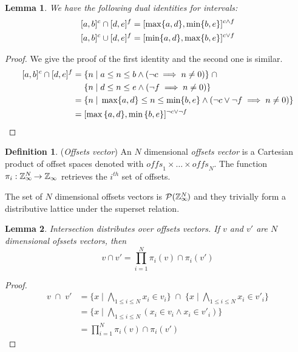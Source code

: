 \documentclass[acmlarge,review]{acmart}
\theoremstyle{definition}
\newtheorem{defn}{Definition}
\theoremstyle{plain}
\newtheorem{lem}{Lemma}
\theoremstyle{remark}
\begin{document}
\begin{lem}{}\label{lem:zinf-identities}
  We have the following dual identities for \zinf{} intervals:
%
  \begin{align*}
    \textnormal{$\lbrack a,b\rbrack^{c}$} \cap \textnormal{$\lbrack d,e\rbrack^{f}$} & =
      \textnormal{$\lbrack\max \{a,d\},\min \{b,e\}\rbrack^{c \wedge f}$} \\
    \textnormal{$\lbrack a,b\rbrack^{c}$} \cup \textnormal{$\lbrack d,e\rbrack^{f}$} & =
      \textnormal{$\lbrack\min \{a,d\},\max \{b,e\}\rbrack^{c \vee f}$}
  \end{align*}
\end{lem}
%
\begin{proof}
  We give the proof of the first identity and the second one is similar.
  \begin{align*}
    \textnormal{$\lbrack a,b\rbrack^{c}$} \cap \textnormal{$\lbrack d,e\rbrack^{f}$} = &
      \; \{ n \;|\; a \leq n \leq b \wedge (\neg c \implies n \neq 0) \}
      \;\cap \\
      & \; \{ n \;|\; d \leq n \leq e \wedge (\neg f \implies n \neq 0) \}
      \\
    = & \; \{ n \;|\; \max \{a,d\} \leq n \leq \min \{b,e\} \wedge (\neg c
      \vee \neg f \implies n \neq 0) \} \\
    = & \; \textnormal{$\lbrack\max{\{a,d\}},\min{\{b,e\}}\rbrack^{\neg c \vee \neg f}$}
  \end{align*}
\end{proof}

\begin{defn}{(\emph{Offsets vector})}
  An $N$ dimensional \emph{offsets vector} is a Cartesian product of offset
  spaces denoted with $\textit{offs}_1 \times \dots \times \textit{offs}_N$.
  The function $\pi_i : \textnormal{$\mathbb{Z}_\infty$}{}^{\mkern-19mu{N}} \to \textnormal{$\mathbb{Z}_\infty$}{}$ retrieves the
  $i^{th}$ set of offsets.

  The set of $N$ dimensional offsets vectors is
  $\mathcal{P}{(\textnormal{$\mathbb{Z}_\infty$}{}^{\mkern-19mu{N}})}$ and they trivially form a
  distributive lattice under the superset relation.
\end{defn}

\begin{lem}{}\label{lem:vector-intersect}
  Intersection distributes over offsets vectors. If $v$ and $v'$ are $N$
  dimensional ofssets vectors, then
%
  \begin{equation*}
    v \cap v' = \prod_{i = 1}^{N} \pi_i(v) \cap \pi_i(v')
  \end{equation*}
\end{lem}
%
\begin{proof}
  \begin{align*}
    v \; \cap \; v' &
    = \{x \mid \bigwedge_{1 \leq i \leq N } x_i \in v_i \}
      \;\cap\;
      \{x \mid \bigwedge_{1 \leq i \leq N } x_i \in v'_i \} \\
    & = \{x \mid \bigwedge_{1 \leq i \leq N } (x_i \in v_i \wedge x_i \in v'_i) \} \\
    & = \prod_{i = 1}^{N} \pi_i(v) \cap \pi_i(v')
  \end{align*}
\end{proof}
\end{document}
